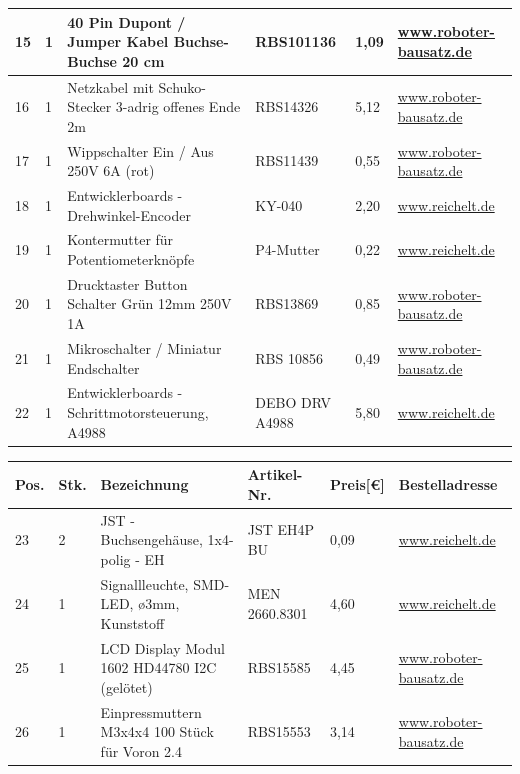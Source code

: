 \begin{itemize}
\begin{center}
\begin{tabularx}{\textwidth}{|p{0.4cm}|p{0.4cm}|X|X|p{1cm}|X|}
			\hline
			15 & 1 & 40 Pin Dupont / Jumper Kabel Buchse-Buchse 20 cm & RBS101136 & 1,09 & \href{https://www.roboter-bausatz.de/p/40-pin-dupont-jumper-kabel-buchse-buchse-20-cm}{www.roboter-bausatz.de} \\
			\hline
			16 & 1 & Netzkabel mit Schuko-Stecker 3-adrig offenes Ende 2m & RBS14326 & 5,12 & \href{https://www.roboter-bausatz.de/p/netzkabel-mit-schuko-stecker-3-adrig-offenes-ende-2m}{www.roboter-bausatz.de} \\
			\hline
			17 & 1 & Wippschalter Ein / Aus 250V 6A (rot) & RBS11439 & 0,55 & \href{https://www.roboter-bausatz.de/p/wippschalter-ein-aus-250v-6a-rot}{www.roboter-bausatz.de} \\
			\hline
			18 & 1 & Entwicklerboards - Drehwinkel-Encoder & KY-040 & 2,20 & \href{www.reichelt.de}{www.reichelt.de} \\
			\hline
			19 & 1 & Kontermutter für Potentiometerknöpfe & P4-Mutter & 0,22 & \href{www.reichelt.de}{www.reichelt.de} \\
			\hline
			20 & 1 & Drucktaster Button Schalter Grün 12mm 250V 1A  & RBS13869 & 0,85 & \href{https://www.roboter-bausatz.de/p/drucktaster-button-schalter-gruen-12mm-250v-1a}{www.roboter-bausatz.de} \\
			\hline
			21 & 1 & Mikroschalter / Miniatur Endschalter & RBS 10856 & 0,49 & \href{https://www.roboter-bausatz.de/p/mikroschalter-miniatur-endschalter}{www.roboter-bausatz.de} \\
			\hline
			22 & 1 & Entwicklerboards - Schrittmotorsteuerung, A4988 & DEBO DRV A4988 & 5,80 & \href{https://wwww.reichelt.de}{www.reichelt.de} \\
			\hline
		\end{tabularx}
		\newpage
		\fontsize{8}{10}\selectfont
		\begin{tabularx}{\textwidth}{|p{0.4cm}|p{0.4cm}|X|X|p{1cm}|X|}
			\hline 
			\textbf{Pos.} & \textbf{Stk.} & \textbf{Bezeichnung} & \textbf{Artikel-Nr.} & \textbf{Preis[€]} & \textbf{Bestelladresse} \\ \hline
			23 & 2 & JST - Buchsengehäuse, 1x4-polig - EH & JST EH4P BU & 0,09 & \href{https://wwww.reichelt.de}{www.reichelt.de} \\
			\hline
			24 & 1 & Signallleuchte, SMD-LED, ø3mm, Kunststoff & MEN 2660.8301 & 4,60 & \href{https://wwww.reichelt.de}{www.reichelt.de} \\
			\hline
			25 & 1 & LCD Display Modul 1602 HD44780 I2C (gelötet) & RBS15585 & 4,45 & \href{https://www.roboter-bausatz.de/p/lcd-display-modul-1602-hd44780-i2c-geloetet}{www.roboter-bausatz.de} \\
			\hline
			26 & 1 & Einpressmuttern M3x4x4 100 Stück für Voron 2.4 & RBS15553 & 3,14 & \href{https://www.roboter-bausatz.de/p/einpressmuttern-m3x4x4-100-stueck-fuer-voron-2.4}{www.roboter-bausatz.de} \\
			\hline
		\end{tabularx}
		
	\end{center}
	
\end{itemize}
